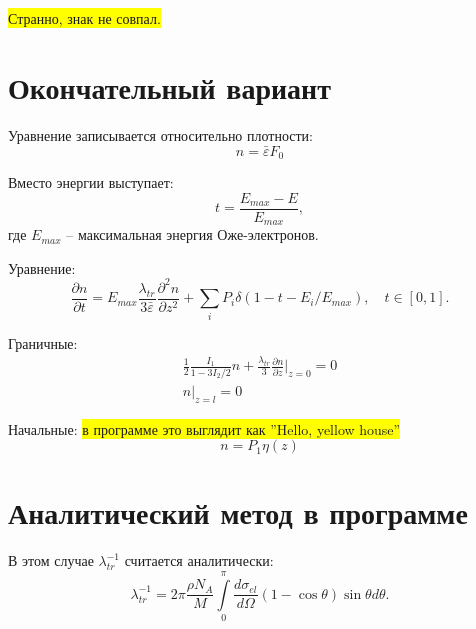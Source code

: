 \documentclass[a4paper,12pt]{article} %
\newcommand{\dff}[2]{\frac{\partial #1}{\partial #2}}
\newcommand{\Dff}[2]{\frac{d #1}{d #2}}
\newcommand{\dfn}[3]{\frac{\partial^#1 #2}{\partial #3^#1}}
\newcommand{\eps}{\varepsilon}
\begin{document}
\colorbox{yellow}{Странно, знак не совпал.}

\clearpage
\section{Окончательный вариант}

Уравнение записывается относительно плотности:
\begin{equation}
	n = \bar{\eps} F_0
\end{equation}

Вместо энергии выступает:
\begin{equation}
	t = \frac{E_{max} - E}{E_{max}},
\end{equation}
где $E_{max}$ -- максимальная энергия Оже-электронов.

Уравнение:
\begin{equation}
	\dff{n}{t} = E_{max}\frac{\lambda_{tr}}{3\bar{\eps}}\dfn{2}{n}{z} + \sum_{i} P_i\delta(1 - t - E_i/E_{max}), \quad t\in[0, 1].
\end{equation}

Граничные:
\begin{gather}
	\frac{1}{2} \frac{I_1}{1 - 3 I_2/2} n + \frac{\lambda_{tr}}{3} \dff{n}{z} \Bigg|_{z = 0} = 0 \\
	n\Bigg|_{z = l} = 0
\end{gather}

Начальные: \colorbox{yellow}{в программе это выглядит как ''Hello, yellow house''}
\begin{equation}
	n = P_1 \eta (z)
\end{equation}

\section{Аналитический метод в программе}

В этом случае $\lambda_{tr}^{-1}$ считается аналитически:
\begin{equation}\label{eq: ltr}
	\lambda_{tr}^{-1} = 
	2 \pi \frac{\rho N_A}{M} \int\limits_{0}^{\pi}
	\Dff{\sigma_{el}}{\Omega} (1 - \cos \theta) \sin \theta d \theta.  
\end{equation}
\end{document}
